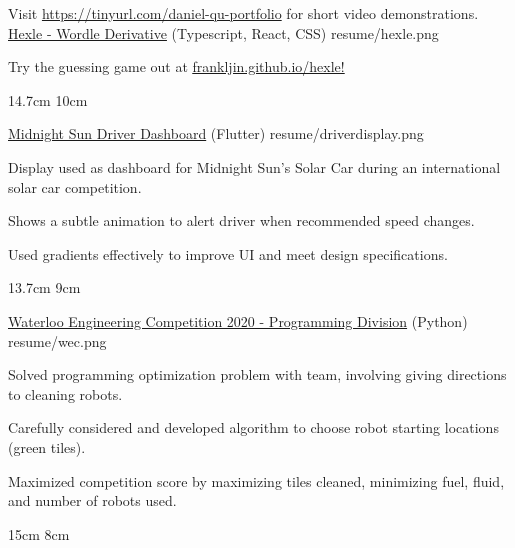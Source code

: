 

\begin{cventries}

  Visit \href{https://docs.google.com/document/d/e/2PACX-1vS0EqgEdK7blzAP3eqhoXZXuYXNIMIreo-fD56--8hDs616NmmvpaythZmCKw7Pt4CDEAfRSdoIxmMB/pub}{https://tinyurl.com/daniel-qu-portfolio} for short video demonstrations.
  \\%
  \portfolioEntry
    {\href{https://frankljin.github.io/hexle/}{Hexle - Wordle Derivative} (Typescript, React, CSS)} %
    {resume/hexle.png} %
    {
      \begin{cvitems} %
        \item {Try the guessing game out at \href{https://frankljin.github.io/hexle/}{\underline{frankljin.github.io/hexle}!}}
      \end{cvitems}
    }
    {14.7cm}
    {10cm}

  \portfolioEntry
    {\href{https://github.com/uw-midsun/telemetry_xiv}{Midnight Sun Driver Dashboard} (Flutter)} %
    {resume/driverdisplay.png} %
    {
      \begin{cvitems} %
        \item {Display used as dashboard for Midnight Sun's Solar Car during an international solar car competition.}
        \item {Shows a subtle animation to alert driver when recommended speed changes.}
        \item {Used gradients effectively to improve UI and meet design specifications.}
      \end{cvitems}
    }
    {13.7cm}
    {9cm}

  \newpage

  \portfolioEntry
    {\href{https://github.com/danielq987/WECF2020}{Waterloo Engineering Competition 2020 - Programming Division} (Python)} %
    {resume/wec.png} %
    {
      \begin{cvitems} %
        \item {Solved programming optimization problem with team, involving giving directions to cleaning robots.}
        \item {Carefully considered and developed algorithm to choose robot starting locations (green tiles).}
        \item {Maximized competition score by maximizing tiles cleaned, minimizing fuel, fluid, and number of robots used.}
      \end{cvitems}
    }
    {15cm}
    {8cm}
  


\end{cventries}
